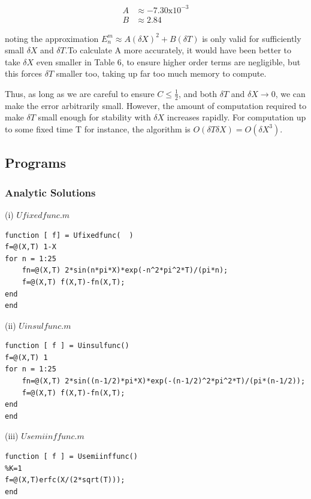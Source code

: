 \documentclass[10pt,a4paper]{report}
\begin{document}
\begin{align*}
A &\approx -7.30\text{x}10^{-3}\\
B &\approx 2.84
\end{align*}

noting the approximation $E_n^m \approx A(\delta X)^2 + B(\delta T)$ is only valid for sufficiently small $\delta X$ and $\delta T$.To calculate A more accurately, it would have been better to take $\delta X$ even smaller in Table 6, to ensure higher order terms are negligible, but this forces $\delta T$ smaller too, taking up far too much memory to compute. 

\vspace{0.5cm}

Thus, as long as we are careful to ensure $C\leq\frac{1}{2}$, and both $\delta T$ and $\delta X \rightarrow 0$, we can make the error arbitrarily small. However, the amount of computation required to make $\delta T$ small enough for stability with $\delta X$ increases rapidly. For computation up to some fixed time T for instance, the algorithm is $O(\delta T\delta X)=O(\delta X^3)$. 

\newpage

\subsection*{Programs}
\vspace{1cm}
\subsubsection*{Analytic Solutions}
\vspace{0.5cm}

(i) $Ufixedfunc.m$
\begin{verbatim}
function [ f] = Ufixedfunc(  )
f=@(X,T) 1-X
for n = 1:25
    fn=@(X,T) 2*sin(n*pi*X)*exp(-n^2*pi^2*T)/(pi*n);
    f=@(X,T) f(X,T)-fn(X,T);
end
end
\end{verbatim}
\vspace{0.5cm}

(ii) $Uinsulfunc.m$
\begin{verbatim}
function [ f ] = Uinsulfunc()
f=@(X,T) 1
for n = 1:25
    fn=@(X,T) 2*sin((n-1/2)*pi*X)*exp(-(n-1/2)^2*pi^2*T)/(pi*(n-1/2));
    f=@(X,T) f(X,T)-fn(X,T);
end
end
\end{verbatim}
\vspace{0.5cm}
 
(iii) $Usemiinffunc.m$
\begin{verbatim}
function [ f ] = Usemiinffunc()
%K=1
f=@(X,T)erfc(X/(2*sqrt(T)));
end
\end{verbatim}
\vspace{0.5cm}
\end{document}
